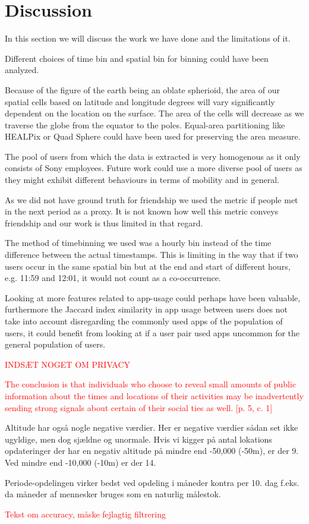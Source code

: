 \chapter{Discussion}
\label{chap:discussion}
In this section we will discuss the work we have done and the limitations of it.

Different choices of time bin and spatial bin for binning could have been analyzed.

Because of the figure of the earth being an oblate spherioid, the area of our spatial cells based on latitude and longitude degrees will vary significantly dependent on the location on the surface. The area of the cells will decrease as we traverse the globe from the equator to the poles. Equal-area partitioning like HEALPix or Quad Sphere could have been used for preserving the area measure.

The pool of users from which the data is extracted is very homogenous as it only consists of Sony employees. Future work could use a more diverse pool of users as they might exhibit different behaviours in terms of mobility and in general.

As we did not have ground truth for friendship we used the metric if people met in the next period as a proxy. It is not known how well this metric conveys friendship and our work is thus limited in that regard.

The method of timebinning we used was a hourly bin instead of the time difference between the actual timestamps. This is limiting in the way that if two users occur in the same spatial bin but at the end and start of different hours, e.g. 11:59 and 12:01, it would not count as a co-occurrence.

Looking at more features related to app-usage could perhaps have been valuable, furthermore the Jaccard index similarity in app usage between users does not take into account disregarding the commonly used apps of the population of users, it could benefit from looking at if a user pair used apps uncommon for the general population of users.

\textcolor{red}{INDSÆT NOGET OM PRIVACY}

\textcolor{red}{The conclusion is that individuals who choose to reveal small amounts of public information about the times and locations of their activities may be inadvertently sending strong signals about certain of their social ties as well. [p. 5, c. 1]}


Altitude har også nogle negative værdier. Her er negative værdier sådan set ikke ugyldige, men dog sjældne og unormale. Hvis vi kigger på antal lokations opdateringer der har en negativ altitude på mindre end -50,000 (-50m), er der 9. Ved mindre end -10,000 (-10m) er der 14.

Periode-opdelingen virker bedst ved opdeling i måneder kontra per 10. dag f.eks. da måneder af mennesker bruges som en naturlig målestok.

\textcolor{red}{Tekst om accuracy, måske fejlagtig filtrering}